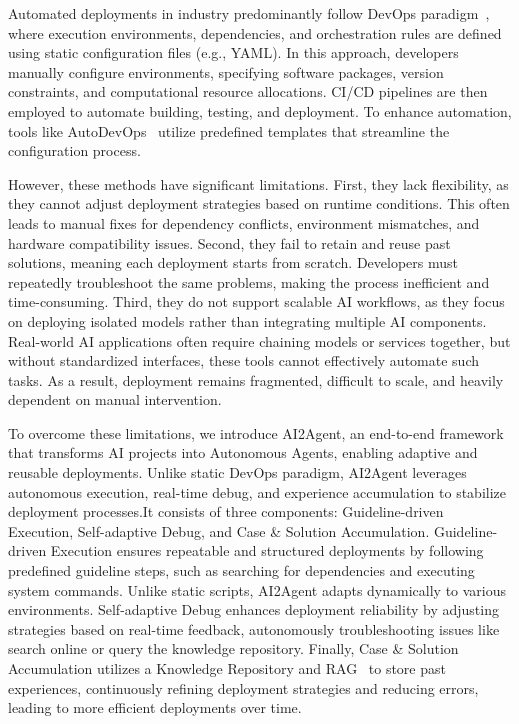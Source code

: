 Automated deployments in industry predominantly follow DevOps paradigm~\cite{bass2015devops,ebert2016devops}, where execution environments, dependencies, and orchestration rules are defined using static configuration files (e.g., YAML). In this approach, developers manually configure environments, specifying software packages, version constraints, and computational resource allocations. CI/CD pipelines are then employed to automate building, testing, and deployment. To enhance automation, tools like AutoDevOps~\cite{AutoDevops} utilize predefined templates that streamline the configuration process. 

However, these methods have significant limitations. First, they lack flexibility, as they cannot adjust deployment strategies based on runtime conditions. This often leads to manual fixes for dependency conflicts, environment mismatches, and hardware compatibility issues. Second, they fail to retain and reuse past solutions, meaning each deployment starts from scratch. Developers must repeatedly troubleshoot the same problems, making the process inefficient and time-consuming. Third, they do not support scalable AI workflows, as they focus on deploying isolated models rather than integrating multiple AI components. Real-world AI applications often require chaining models or services together, but without standardized interfaces, these tools cannot effectively automate such tasks. As a result, deployment remains fragmented, difficult to scale, and heavily dependent on manual intervention.

To overcome these limitations, we introduce AI2Agent, an end-to-end framework that transforms AI projects into Autonomous Agents, enabling adaptive and reusable deployments. Unlike static DevOps paradigm, AI2Agent leverages autonomous execution, real-time debug, and experience accumulation to stabilize deployment processes.It consists of three components: Guideline-driven Execution, Self-adaptive Debug, and Case \& Solution Accumulation. Guideline-driven Execution ensures repeatable and structured deployments by following predefined guideline steps, such as searching for dependencies and executing system commands. Unlike static scripts, AI2Agent adapts dynamically to various environments. Self-adaptive Debug enhances deployment reliability by adjusting strategies based on real-time feedback, autonomously troubleshooting issues like search online or query the knowledge repository. Finally, Case \& Solution Accumulation utilizes a Knowledge Repository and RAG~\cite{graphrag,lightrag,ragflow}
to store past experiences, continuously refining deployment strategies and reducing errors, leading to more efficient deployments over time.

